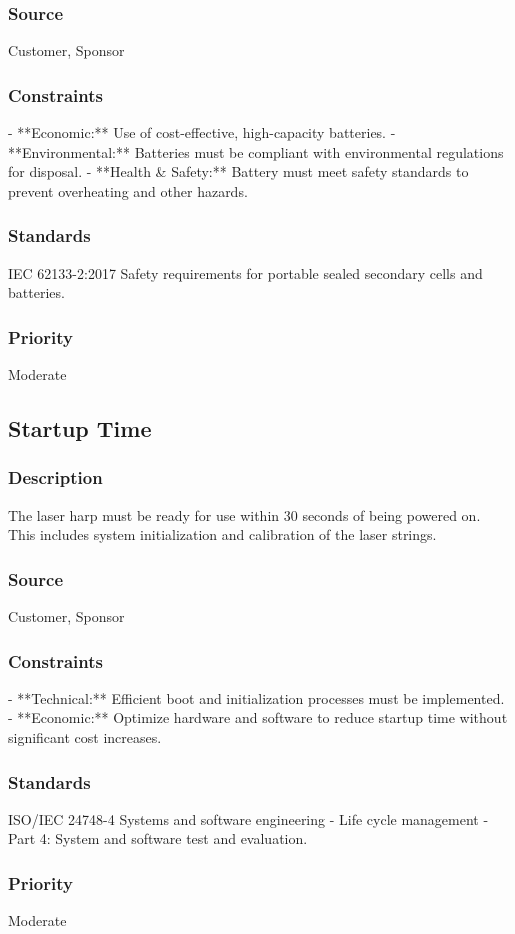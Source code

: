 \subsubsection{Source}
Customer, Sponsor
\subsubsection{Constraints}
- **Economic:** Use of cost-effective, high-capacity batteries.
- **Environmental:** Batteries must be compliant with environmental regulations for disposal.
- **Health & Safety:** Battery must meet safety standards to prevent overheating and other hazards.
\subsubsection{Standards}
IEC 62133-2:2017 Safety requirements for portable sealed secondary cells and batteries.
\subsubsection{Priority}
Moderate


\subsection{Startup Time}
\subsubsection{Description}
The laser harp must be ready for use within 30 seconds of being powered on. This includes system initialization and calibration of the laser strings.
\subsubsection{Source}
Customer, Sponsor
\subsubsection{Constraints}
- **Technical:** Efficient boot and initialization processes must be implemented.
- **Economic:** Optimize hardware and software to reduce startup time without significant cost increases.
\subsubsection{Standards}
ISO/IEC 24748-4 Systems and software engineering - Life cycle management - Part 4: System and software test and evaluation.
\subsubsection{Priority}
Moderate


